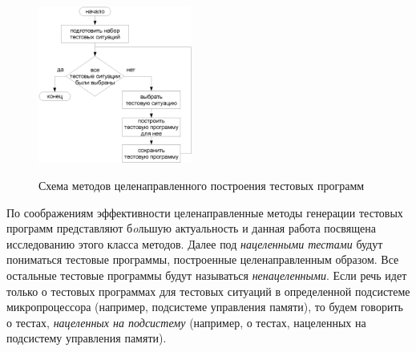 \begin{figure}[h] \center
  \includegraphics[width=0.45\textwidth]{1.review/methods2}\\
  \caption{Схема методов целенаправленного построения тестовых программ}\label{fig:directed_methods}
\end{figure}

По соображениям эффективности целенаправленные методы генерации тестовых программ представляют б\textit{o}льшую актуальность и данная работа посвящена исследованию этого класса методов. Далее под \emph{нацеленными тестами} будут пониматься тестовые программы, построенные целенаправленным образом. Все остальные тестовые программы будут называться \emph{ненацеленными}. Если речь идет только о тестовых программах для тестовых ситуаций в определенной подсистеме микропроцессора (например, подсистеме управления памяти), то будем говорить о тестах, \emph{нацеленных на подсистему} (например, о тестах, нацеленных на подсистему управления памяти).




